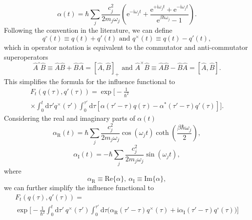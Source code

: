 \begin{equation}
\alpha(t) = \hbar\sum_j \frac{c_j^2}{2m_j\omega_j}\left(\mathrm{e}^{-\mathrm{i}\omega_j t} + \frac{\mathrm{e}^{+\mathrm{i}\omega_j t}+\mathrm{e}^{-\mathrm{i}\omega_j t}}{\mathrm{e}^{\beta\hbar\omega_j}-1}\right).
\end{equation}
Following the convention in the literature, we can define
\begin{equation}
q^\circ(t) \equiv q(t)+q'(t)\text{  and  } q^\times(t) \equiv q(t)-q'(t),
\end{equation}
which in operator notation is equivalent to the commutator and anti-commutator superoperators
\begin{equation}
\hat{A}^\circ \hat{B} \equiv \hat{A}\hat{B}+\hat{B}\hat{A}=[\hat{A},\hat{B}]_+\text{  and  } \hat{A}^\times \hat{B} \equiv \hat{A}\hat{B}-\hat{B}\hat{A} = [\hat{A},\hat{B}].
\end{equation}
This simplifies the formula for the influence functional to
\begin{multline}
F_t(q(\tau),q'(\tau)) = \exp\biggl[-\frac{1}{\hbar^2} \\
\times
\int_0^t\mathrm{d}\tau'
q^\times(\tau') 
\int_0^{\tau'}\mathrm{d}\tau
[\alpha(\tau'-\tau)q(\tau)-\alpha^*(\tau'-\tau)q'(\tau)]\biggr].
\label{eq:influence_functional}
\end{multline}
Considering the real and imaginary parts of $\alpha(t)$
\begin{equation}
\alpha_\mathrm{R}(t) = \hbar\sum_j \frac{c_j^2}{2m_j\omega_j} \cos(\omega_j t) \coth\left(\frac{\beta\hbar\omega_j}{2}\right),
\end{equation}
\begin{equation}
\alpha_\mathrm{I}(t) = - \hbar\sum_j \frac{c_j^2}{2m_j\omega_j} \sin(\omega_j t),
\end{equation}
where
\begin{equation}
\alpha_\mathrm{R} \equiv \mathrm{Re}\{\alpha\},\ \alpha_\mathrm{I} \equiv \mathrm{Im}\{\alpha\},
\end{equation}
we can further simplify the influence functional to
\begin{multline}
F_t(q(\tau),q'(\tau)) = \\
\exp\biggl[-\frac{1}{\hbar^2}
\int_0^t\mathrm{d}\tau'
\ q^\times(\tau')
\int_0^{\tau'}\mathrm{d}\tau
 \biggl(\alpha_\mathrm{R}(\tau'-\tau)q^\times(\tau)+\mathrm{i}\alpha_\mathrm{I}(\tau'-\tau)q^\circ(\tau)\biggr)\biggr]
\end{multline}

